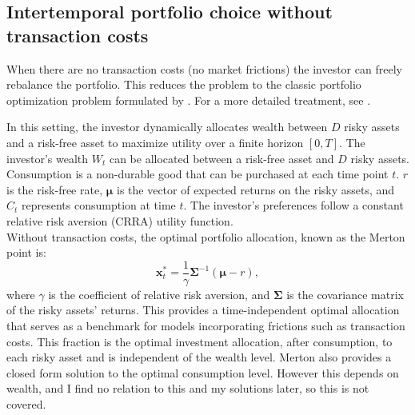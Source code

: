 \documentclass[11pt]{article}
\begin{document}
\subsection{Intertemporal portfolio choice without transaction costs} \label{Subsection: Intertemporal-Portfolio-Choice}
When there are no transaction costs (no market frictions) the investor can freely rebalance the portfolio.
This reduces the problem to the classic portfolio optimization problem formulated by \autocites{Merton1969}{Merton1971}.
For a more detailed treatment, see \autocite{Bjork}. 

In this setting, the investor dynamically allocates wealth between \(D\) risky assets and a risk-free asset to maximize utility over a finite horizon \([0,T]\).
The investor's wealth \(W_t\) can be allocated between a risk-free asset and \(D\) risky assets.
Consumption is a non-durable good that can be purchased at each time point \(t\).
\(r\) is the risk-free rate, \(\boldsymbol{\mu}\) is the vector of expected returns on the risky assets, and \(C_t\) represents consumption at time \(t\). The investor’s preferences follow a constant relative risk aversion (CRRA) utility function.\\
Without transaction costs, the optimal portfolio allocation, known as the Merton point is:
\begin{equation}
    \mathbf{x}_t^* = \frac{1}{\gamma} \boldsymbol{\Sigma}^{-1} (\boldsymbol{\mu} - r ),
\end{equation}
where \(\gamma\) is the coefficient of relative risk aversion, and \(\boldsymbol{\Sigma}\) is the covariance matrix of the risky assets' returns.
This provides a time-independent optimal allocation that serves as a benchmark for models incorporating frictions such as transaction costs.
This fraction is the optimal investment allocation, after consumption, to each risky asset and is independent of the wealth level.
Merton also provides a closed form solution to the optimal consumption level. However this depends on wealth, and
I find no relation to this and my solutions later, so this is not covered.
\end{document}
